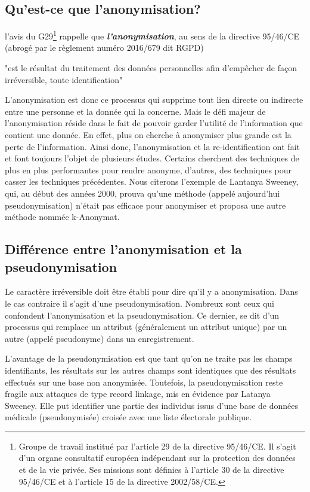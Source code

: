\subsection{Qu'est-ce que l’anonymisation?} 

l’avis du G29\footnote{Groupe de travail institué par l’article 29 de la directive 95/46/CE. Il s’agit d’un organe consultatif européen indépendant
sur la protection des données et de la vie privée. Ses missions sont définies à l’article 30 de la directive 95/46/CE et à l’article
15 de la directive 2002/58/CE.}\cite{noauthor_avis_nodate} rappelle que \textbf{\emph{l’anonymisation}}, au sens de la directive 95/46/CE (abrogé par le règlement numéro 2016/679 dit \gls{RGPD})
\begin{em}
    "est le résultat du traitement des données personnelles afin d’empêcher de façon irréversible, toute identification"
\end{em}  

L’anonymisation est donc ce processus qui supprime tout lien directe ou indirecte entre une personne et la donnée qui la concerne. Mais le défi majeur de l’anonymisation réside dans le fait de pouvoir garder l’utilité de l’information que contient une donnée.  En effet, plus on cherche à anonymiser plus grande est la perte de l’information.  
Ainsi donc, l’anonymisation et la re-identification ont fait et font toujours l’objet de plusieurs études. Certains cherchent des techniques de plus en plus performantes pour rendre anonyme, d’autres, des techniques pour casser les techniques précédentes. Nous citerons l'exemple de Lantanya Sweeney, qui, au début des années 2000, prouva qu’une méthode (appelé aujourd’hui pseudonymisation) n’était pas efficace pour anonymiser et   proposa une autre méthode nommée k-Anonymat\cite{sweeney_k-anonymity:_2002}.

\subsection{Différence entre l’anonymisation et la pseudonymisation}

Le caractère irréversible doit être établi pour dire qu’il y a anonymisation. Dans le cas contraire il s’agit d’une pseudonymisation. Nombreux sont ceux qui confondent l’anonymisation et la pseudonymisation. Ce dernier, se dit d’un processus qui remplace un attribut (généralement un attribut unique) par un autre (appelé pseudonyme) dans un enregistrement\cite{noauthor_avis_nodate}. 

L’avantage de la pseudonymisation est que tant qu’on ne traite pas les champs identifiants, les résultats sur les autres champs sont identiques que des résultats effectués sur une base non anonymisée. Toutefois, la pseudonymisation reste fragile aux attaques de type record linkage, mis en évidence par Latanya Sweeney. Elle put identifier une partie des individus issus d’une base de données médicale (pseudonymisée) croisée avec une liste électorale publique. 

